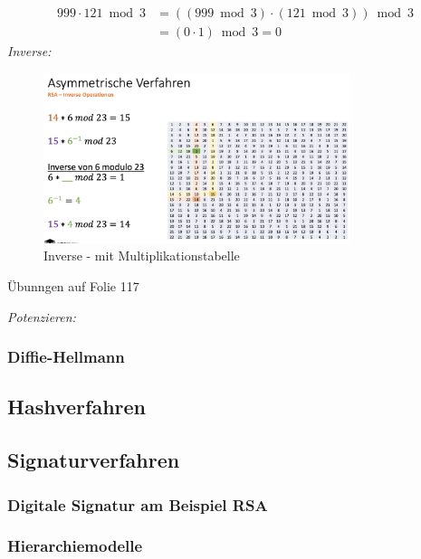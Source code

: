 \documentclass[a4paper,12pt]{article}
\begin{document}
    \begin{align*}
    999 \cdot 121 \bmod 3 &= ((999 \bmod 3) \cdot (121 \bmod 3)) \bmod 3 \\
    &= (0 \cdot 1) \bmod 3 = 0
    \end{align*}
\vspace*{1em}
\textit{Inverse:}
\begin{figure}[H]
    \centering
    \includegraphics[width=0.8\textwidth]{bilder/inverse.png}
    \caption{Inverse - mit Multiplikationstabelle}
    \label{fig:inverse}
\end{figure}
Übunngen auf Folie 117

\vspace*{1em}
\textit{Potenzieren:}

\subsubsection{Diffie-Hellmann}

\subsection{Hashverfahren}

\subsection{Signaturverfahren}
\subsubsection{Digitale Signatur am Beispiel RSA}
\subsubsection{Hierarchiemodelle}
\end{document}
